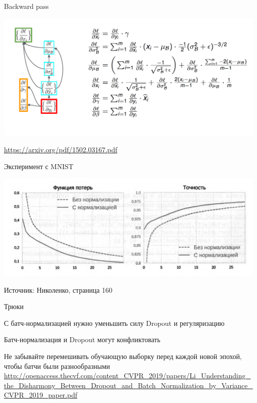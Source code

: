 \documentclass[notes,12pt, aspectratio=169]{beamer}
\newenvironment{wideitemize}{\itemize\addtolength{\itemsep}{10pt}}{\enditemize}
\begin{document}
\begin{frame}{Backward pass}
\begin{center}
	\includegraphics[width=.95\linewidth]{batch_grad.png}
\end{center}
\vfill %
\footnotesize
{\color{blue} \url{https://arxiv.org/pdf/1502.03167.pdf}}
\end{frame}


\begin{frame}{Эксперимент с MNIST}
\begin{center}
	\includegraphics[width=.8\linewidth]{batch_norm.png}
\end{center}
\vfill
{\small  Источник: Николенко, страница 160}
\end{frame}


\begin{frame}{Трюки}
\begin{wideitemize}
	\item  С батч-нормализацией нужно уменьшить силу Dropout и регуляризацию
	
	\item Батч-нормализация и Dropout могут конфликтовать 
	
	\item  Не забывайте перемешивать обучающую выборку перед каждой новой эпохой, чтобы батчи были разнообразными 
\end{wideitemize}
\vspace{3cm} %
\footnotesize
{\color{blue} \url{http://openaccess.thecvf.com/content_CVPR_2019/papers/Li_Understanding_the_Disharmony_Between_Dropout_and_Batch_Normalization_by_Variance_CVPR_2019_paper.pdf}}
\end{frame}
\end{document}
